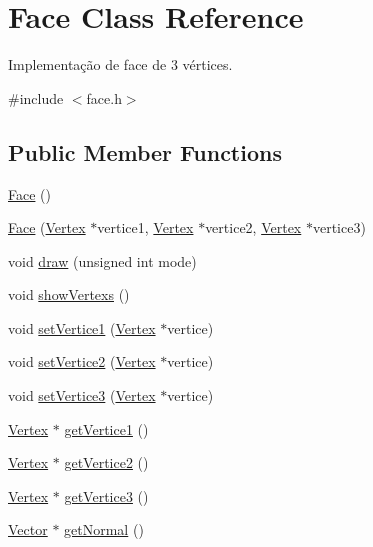 \hypertarget{class_face}{\section{Face Class Reference}
\label{class_face}
}


Implementação de face de 3 vértices.  




{\ttfamily \#include $<$face.\-h$>$}

\subsection*{Public Member Functions}
\begin{DoxyCompactItemize}
\item 
\hyperlink{class_face_afdb634bc2d5287ba0d62e46b57e9dc2e}{Face} ()
\item 
\hyperlink{class_face_a21efca31beed80f6b81bb520f5ccef6d}{Face} (\hyperlink{class_vertex}{Vertex} $\ast$vertice1, \hyperlink{class_vertex}{Vertex} $\ast$vertice2, \hyperlink{class_vertex}{Vertex} $\ast$vertice3)
\item 
void \hyperlink{class_face_ab9060c770fb23beb757bcc03f3eaba1d}{draw} (unsigned int mode)
\item 
void \hyperlink{class_face_a5bbea3c2f6acf25363244cb176447810}{show\-Vertexs} ()
\item 
void \hyperlink{class_face_a9e605a18597b8ec227a830455bb8cfff}{set\-Vertice1} (\hyperlink{class_vertex}{Vertex} $\ast$vertice)
\item 
void \hyperlink{class_face_a34993dd2fd904d182f496edc803ba04e}{set\-Vertice2} (\hyperlink{class_vertex}{Vertex} $\ast$vertice)
\item 
void \hyperlink{class_face_ac77cf3f5b8e1ad4bc8a36a6d01e863e2}{set\-Vertice3} (\hyperlink{class_vertex}{Vertex} $\ast$vertice)
\item 
\hyperlink{class_vertex}{Vertex} $\ast$ \hyperlink{class_face_ad58621048d6572cd0ab69971e5054fe0}{get\-Vertice1} ()
\item 
\hyperlink{class_vertex}{Vertex} $\ast$ \hyperlink{class_face_ab506f3cd38c5fbcc0066ea561f5de5c9}{get\-Vertice2} ()
\item 
\hyperlink{class_vertex}{Vertex} $\ast$ \hyperlink{class_face_a73b0497cfb36b239b2a9f59e87e17c07}{get\-Vertice3} ()
\item 
\hyperlink{class_vector}{Vector} $\ast$ \hyperlink{class_face_a408d3628671e3fda8048dbb18bb79c96}{get\-Normal} ()
\end{DoxyCompactItemize}


